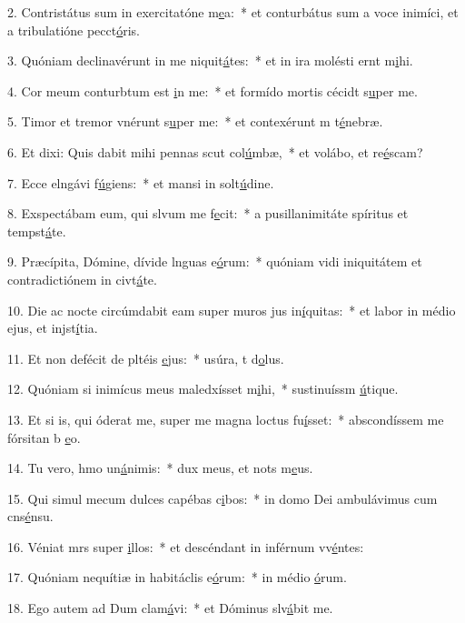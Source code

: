 2. Contristátus sum in exercitatóne m\uline{e}a:~* et conturbátus sum a voce inimíci, et a tribulatióne pecct\uline{ó}ris.\par 
3. Quóniam declinavérunt in me niquit\uline{á}tes:~* et in ira molésti ernt m\uline{i}hi.\par 
4. Cor meum conturbtum est \uline{i}n me:~* et formído mortis cécidt s\uline{u}per me.\par 
5. Timor et tremor vnérunt s\uline{u}per me:~* et contexérunt m t\uline{é}nebræ.\par 
6. Et dixi: Quis dabit mihi pennas scut col\uline{ú}mbæ,~* et volábo, et re\uline{é}scam?\par 
7. Ecce elngávi f\uline{ú}giens:~* et mansi in solt\uline{ú}dine.\par 
8. Exspectábam eum, qui slvum me f\uline{e}cit:~* a pusillanimitáte spíritus et tempst\uline{á}te.\par 
9. Præcípita, Dómine, dívide lnguas e\uline{ó}rum:~* quóniam vidi iniquitátem et contradictiónem in civt\uline{á}te.\par 
10. Die ac nocte circúmdabit eam super muros jus in\uline{í}quitas:~* et labor in médio ejus, et injst\uline{í}tia.\par 
11. Et non defécit de pltéis \uline{e}jus:~* usúra, t d\uline{o}lus.\par 
12. Quóniam si inimícus meus maledxísset m\uline{i}hi,~* sustinuíssm \uline{ú}tique.\par 
13. Et si is, qui óderat me, super me magna loctus fu\uline{í}sset:~* abscondíssem me fórsitan b \uline{e}o.\par 
14. Tu vero, hmo un\uline{á}nimis:~* dux meus, et nots m\uline{e}us.\par 
15. Qui simul mecum dulces capébas c\uline{i}bos:~* in domo Dei ambulávimus cum cns\uline{é}nsu.\par 
16. Véniat mrs super \uline{i}llos:~* et descéndant in inférnum vv\uline{é}ntes:\par 
17. Quóniam nequítiæ in habitáclis e\uline{ó}rum:~* in médio \uline{ó}rum.\par 
18. Ego autem ad Dum clam\uline{á}vi:~* et Dóminus slv\uline{á}bit me.\par 
